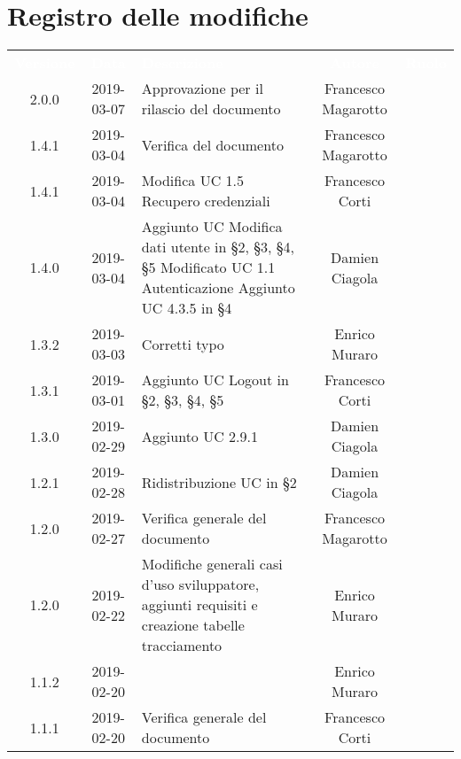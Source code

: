 \section*{Registro delle modifiche}
{
	\renewcommand{\arraystretch}{1.5}
	\centering
	\begin{longtable}{ c c C{6cm} c c }
		\textcolor{white}{\textbf{Versione}} & \textcolor{white}{\textbf{Data}} & \textcolor{white}{\textbf{Descrizione}} & \textcolor{white}{\textbf{Autore}} & \textcolor{white}{\textbf{Ruolo}}\\
		2.0.0 &
		2019-03-07 &
		Approvazione per il rilascio del documento &
		Francesco Magarotto &
		\Res{} \\
		1.4.1 &
		2019-03-04 &
		Verifica del documento &
		Francesco Magarotto &
		\ver{} \\
		1.4.1 &
		2019-03-04 &
		Modifica UC 1.5 Recupero credenziali &
		Francesco Corti &
		\reda{} \\
		1.4.0 & 
		2019-03-04 &
		Aggiunto UC Modifica dati utente in §2, §3, §4, §5 \newline Modificato UC 1.1 Autenticazione \newline Aggiunto UC 4.3.5 in §4 &
		Damien Ciagola &
		\reda{} \\
		1.3.2 & 
		2019-03-03 &
		Corretti typo &
		Enrico Muraro &
		\reda{} \\
		1.3.1 &
		2019-03-01 &
		Aggiunto UC Logout in §2, §3, §4, §5 &
		Francesco Corti &
		\reda{} \\
		1.3.0 &
		2019-02-29 &
		Aggiunto UC 2.9.1 &
		Damien Ciagola&
		\reda{} \\
		1.2.1 &
		2019-02-28 &
		Ridistribuzione UC in §2 &
		Damien Ciagola&
		\reda{} \\	
		
		1.2.0 & 
		2019-02-27 &  
		Verifica generale del documento & 	
		Francesco Magarotto  &	
		\ver{} \\
		
		1.2.0 &
		2019-02-22 &
		Modifiche generali casi d'uso sviluppatore, aggiunti requisiti e creazione tabelle tracciamento &
		Enrico Muraro&
		\reda{} \\	
		
		1.1.2 &
		2019-02-20 &
		&
		Enrico Muraro&
		\reda{} \\		
				
		1.1.1 &
		2019-02-20 &
		Verifica generale del documento&
		Francesco Corti&
		\reda{} \\		
				

\end{longtable}}
